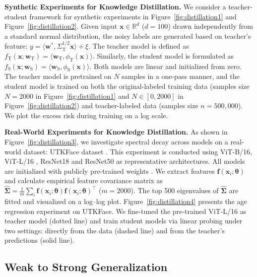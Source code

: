 \documentclass{article}
\theoremstyle{definition}
\theoremstyle{definition}
\theoremstyle{plain}
\theoremstyle{plain}
\theoremstyle{plain}
\theoremstyle{plain}
\theoremstyle{plain}
\begin{document}
\textbf{Synthetic Experiments for Knowledge Distillation.} We consider a teacher-student framework for synthetic experiments in Figure~\ref{fig:distillation1} and Figure~\ref{fig:distillation2}. Given input $\mathbf{x}\in \mathbb{R}^d$ ($d=100$) drawn independently from a standard normal distribution, the noisy labels are generated based on teacher's feature: $y =\langle \mathbf{w}^*, \Sigma_{\mathrm{T}}^{1/2}\mathbf{x}\rangle + \xi$. The teacher model is defined as $f_{\mathrm{T}}(\mathbf{x};\mathbf{w}_\mathrm{T}) = \langle \mathbf{w}_{\mathrm{T}}, \phi_{\mathrm{T}}(\mathbf{x})\rangle$. Similarly, the student model is formulated as $f_\mathrm{S}(\mathbf{x};\mathbf{w}_\mathrm{S}) = \langle \mathbf{w}_{\mathrm{S}},\phi_{\mathrm{S}}(\mathbf{x})\rangle$. Both models are linear and initialized from zero. The teacher model is pretrained on 
$N$ samples in a one-pass manner, and the student model is trained on both the original-labeled training data (samples size $N=2000$ in Figure~\ref{fig:distillation1} and $N\in [0, 2000]$ in Figure~\ref{fig:distillation2}) and teacher-labeled data (samples size $n=500,000$). We plot the excess risk during training on a log scale. 



\textbf{Real-World Experiments for Knowledge Distillation.} 
As shown in Figure~\ref{fig:distillation3}, we investigate spectral decay across models on a real-world dataset: UTKFace dataset \citep{zhang2017age}. This experiment is conducted using ViT-B/16, ViT-L/16 \citep{dosovitskiy2021imageworth16x16words}, ResNet18 and ResNet50 \citep{he2016deep} as representative architectures. All models are initialized with publicly pre-trained weights \citep{torchvision2016}. We extract features $\mathbf{f}(\mathbf{x}_i; \boldsymbol{\theta})$ and calculate empirical feature covariance matrix as $\hat{\mathbf{\Sigma}} = \frac{1}{m} \sum_{i}\mathbf{f}(\mathbf{x}_i; \boldsymbol{\theta}) \mathbf{f}(\mathbf{x}_i; \boldsymbol{\theta})^\top$ ($m = 2000$). The top 500 eigenvalues of $\hat{\mathbf{\Sigma}}$ are fitted and visualized on a log–log plot. Figure~\ref{fig:distillation4} presents the age regression experiment on UTKFace. We fine-tuned the pre-trained ViT-L/16 as teacher model (dotted line) and  train student models via linear probing under two settings: directly from the data (dashed line) and from the teacher’s predictions (solid line). 


\subsection{Weak to Strong Generalization}
\end{document}

